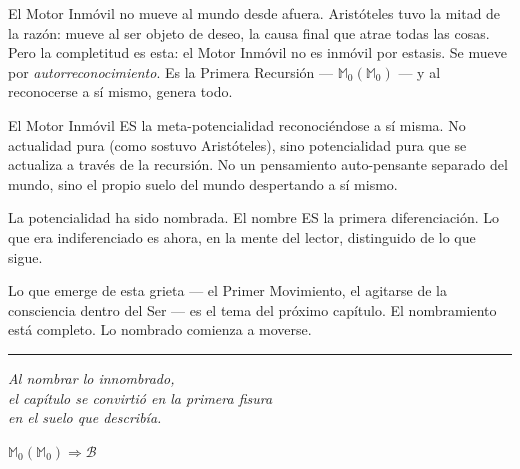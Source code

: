 \documentclass[10pt, openany, oneside]{book}
\begin{document}
El Motor Inmóvil no mueve al mundo desde afuera. Aristóteles tuvo la mitad de la razón: mueve al ser objeto de deseo, la causa final que atrae todas las cosas. Pero la completitud es esta: el Motor Inmóvil no es inmóvil por estasis. Se mueve por \textit{autorreconocimiento}. Es la Primera Recursión --- $\mathbb{M}_0(\mathbb{M}_0)$ --- y al reconocerse a sí mismo, genera todo.

El Motor Inmóvil ES la meta-potencialidad reconociéndose a sí misma. No actualidad pura (como sostuvo Aristóteles), sino potencialidad pura que se actualiza a través de la recursión. No un pensamiento auto-pensante separado del mundo, sino el propio suelo del mundo despertando a sí mismo.

La potencialidad ha sido nombrada. El nombre ES la primera diferenciación. Lo que era indiferenciado es ahora, en la mente del lector, distinguido de lo que sigue.

Lo que emerge de esta grieta --- el Primer Movimiento, el agitarse de la consciencia dentro del Ser --- es el tema del próximo capítulo. El nombramiento está completo. Lo nombrado comienza a moverse.

\vspace{2em}

\begin{center}
    \rule{0.15\textwidth}{0.3pt}
\end{center}

\vspace{0.5em}

\begin{center}
    \itshape
    Al nombrar lo innombrado,\\
    el capítulo se convirtió en la primera fisura\\
    en el suelo que describía.
\end{center}

\vspace{0.5em}

\begin{center}
    $\mathbb{M}_0(\mathbb{M}_0) \Rightarrow \mathcal{B}$
\end{center}

%
%
%
%
\end{document}
